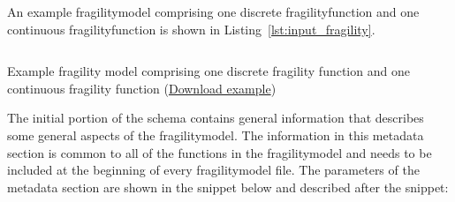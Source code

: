 An example \gls{fragilitymodel} comprising one discrete
\gls{fragilityfunction} and one continuous \gls{fragilityfunction} is shown in
Listing~\ref{lst:input_fragility}.

\begin{listing}[htbp]
  \inputminted[firstline=1,firstnumber=1,fontsize=\footnotesize,frame=single,linenos,bgcolor=lightgray]{xml}{oqum/risk/Verbatim/input_fragility.xml}
  \caption{Example fragility model comprising one discrete fragility function and one continuous fragility function (\href{https://raw.githubusercontent.com/GEMScienceTools/oq-engine-docs/master/oqum/risk/verbatim/input_fragility.xml}{Download example})}
  \label{lst:input_fragility}
\end{listing}


The initial portion of the schema contains general information that describes
some general aspects of the \gls{fragilitymodel}. The information in this
metadata section is common to all of the functions in the \gls{fragilitymodel}
and needs to be included at the beginning of every \gls{fragilitymodel} file.
The parameters of the metadata section are shown in the snippet below and
described after the snippet:

\inputminted[firstline=4,firstnumber=4,lastline=9,fontsize=\footnotesize,frame=single,linenos,bgcolor=lightgray]{xml}{oqum/risk/Verbatim/input_fragility.xml}

